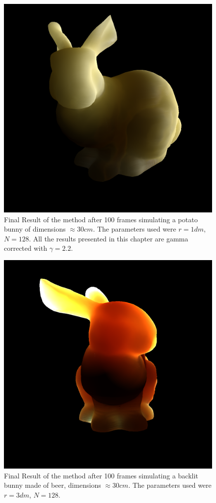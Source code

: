 \begin{figure}[!ht]
\centering
\includegraphics[width=0.8 \linewidth]{images/results/potato_100_convergence.png}
\caption{Final Result of the method after 100 frames simulating a potato bunny of dimensions $\approx 30 cm$. The parameters used were $r = 1 dm$, $N = 128$. All the results presented in this chapter are gamma corrected with $\gamma = 2.2$.}
\label{fig:potato_result}
\end{figure} 

\begin{figure}[!ht]
\centering
\includegraphics[width=0.8 \linewidth]{images/results/beer_backlit_100_convergence.png}
\caption{Final Result of the method after 100 frames simulating a backlit bunny made of beer, dimensions $\approx 30 cm$. The parameters used were $r = 3 dm$, $N = 128$.}
\label{fig:beer_result}
\end{figure} 
 

